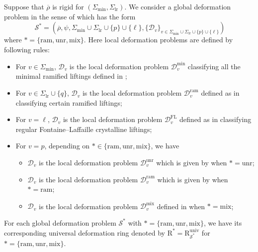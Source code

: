 \documentclass[10pt]{amsart}
\numberwithin{equation}{section}
\theoremstyle{definition}
\def\min{\mathrm{min}}
\def\lr{\mathrm{lr}}
\def\mix{\mathrm{mix}}
\def\ram{\mathrm{ram}}
\def\calD{\mathcal{D}}
\def\calS{\mathcal{S}}
\def\rmR{\mathrm{R}}
\def\unr{\mathrm{unr}}
\begin{document}
Suppose that $\overline{\rho}$ is rigid for $(\Sigma_{\min}, \Sigma_{\lr})$. We consider a global deformation problem in the sense of \cite[Definition 2.2]{Wangd} which has the form
\begin{equation*}\
\calS^{\ast}=(\overline{\rho}, \psi, \Sigma_{\min}\cup\Sigma_{\lr}\cup\{p\}\cup\{\ell\}, \{\calD_{v}\}_{v\in\Sigma_{\min}\cup\Sigma_{\lr}\cup\{p\}\cup\{\ell\}})
\end{equation*}
where  $\ast=\{\ram, \unr, \mix\}$. Here local deformation problems are defined by following rules:
\begin{itemize}
\item For $v\in\Sigma_{\min}$, $\calD_{v}$ is the local deformation problem $\calD^{\min}_{v}$ classifying all the minimal ramified liftings defined in \cite[Defintion 3.4]{Wangd};
\item For $v\in\Sigma_{\lr}\cup\{q\}$, $\calD_{v}$ is the local deformation problem $\calD^{\mathrm{ram}}_{v}$ defined as in \cite[Definition 3.6 (2)]{Wangd} classifying certain ramified liftings;
\item For $v=\ell$, $\calD_{v}$ is the local deformation problem $\calD^{\mathrm{FL}}_{v}$ defined as in \cite[Definition 3.1.1]{Wangd} classifying regular Fontaine--Laffaille crystalline liftings;
\item For $v=p$, depending on $\ast\in\{\ram, \unr, \mix\}$, we have
\begin{itemize}
\item $\calD_{v}$ is the local deformation problem $\calD^{\unr}_{v}$ which is given by \cite[Definition 3.6 (2)]{Wangd} when $\ast=\unr$;
\item $\calD_{v}$ is the local deformation problem $\calD^{\ram}_{v}$ which is given by \cite[Definition 3.6 (3)]{Wangd} when $\ast=\ram$;
\item $\calD_{v}$ is the local deformation problem $\calD^{\mix}_{v}$ defined in \cite[Definition 3.6 (1)]{Wangd} when $\ast=\mix$;
\end{itemize}
\end{itemize}
For each global deformation problem $\calS^{\ast}$ with $\ast=\{\ram, \unr, \mix\}$, we have its corresponding universal deformation ring denoted by 
$\rmR^{\ast}=\rmR^{\mathrm{univ}}_{\calS^{\ast}}$ for $\ast=\{\ram, \unr, \mix\}$.
\end{document}
